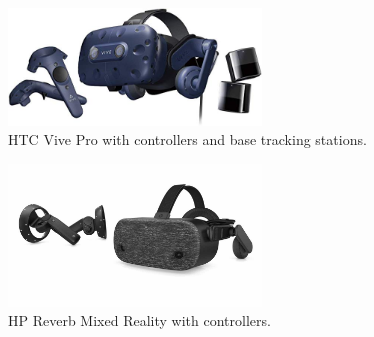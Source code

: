 \begin{figure}[!ht]
    \centering
    \includegraphics[width=0.6\textwidth]{./fig/background/htcVivePro.jpg}
    \caption{HTC Vive Pro with controllers and base tracking stations.}
    \label{fig:htcVivePro}
\end{figure}

\begin{figure}[!ht]
    \centering
    \includegraphics[width=0.6\textwidth]{./fig/background/hpReverbPro.jpg}
    \caption{HP Reverb Mixed Reality with controllers.}
    \label{fig:hpReverb}
\end{figure}


\cleardoublepage